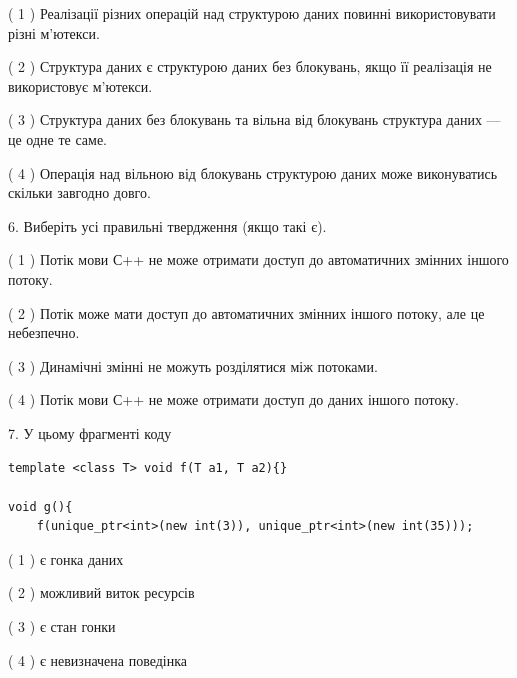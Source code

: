 \documentclass[12pt, ukrainian]{article}
\begin{document}
\begin {large}
{( 1 ) Реалізації різних операцій над структурою даних повинні використовувати різні м’ютекси.%

( 2 ) Структура даних є структурою даних без блокувань, якщо її реалізація не використовує м’ютекси.%

( 3 ) Структура даних без блокувань та вільна від блокувань структура даних --- це одне те саме.%

( 4 ) Операція над вільною від блокувань структурою даних може виконуватись скільки завгодно довго.%
\newpage



\vspace{5mm}
6. Виберіть усі правильні твердження (якщо такі є).\par
\vspace{2mm}

( 1 ) Потік мови С++ не може отримати доступ до автоматичних змінних іншого потоку.%

( 2 ) Потік може мати доступ до автоматичних змінних іншого потоку, але це небезпечно.%

( 3 ) Динамічні змінні не можуть розділятися між потоками.%

( 4 ) Потік мови С++ не може отримати доступ до даних іншого потоку.%


\vspace{5mm}
7. У цьому фрагменті коду
\begin{verbatim}
template <class T> void f(T a1, T a2){}

void g(){
    f(unique_ptr<int>(new int(3)), unique_ptr<int>(new int(35)));
\end{verbatim}

( 1 ) є гонка даних%

( 2 ) можливий виток ресурсів%

( 3 ) є стан гонки%

( 4 ) є невизначена поведінка%
}
\end {large}
\end{document}
